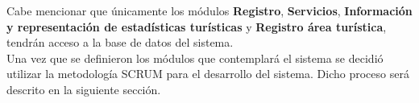 Cabe mencionar que únicamente los módulos \textbf{Registro}, \textbf{Servicios}, \textbf{Información y representación de estadísticas turísticas} y \textbf{Registro área turística}, tendrán acceso a la base de datos del sistema. \\

Una vez que se definieron los módulos que contemplará el sistema se decidió utilizar la metodología SCRUM para el desarrollo del sistema. Dicho proceso será descrito en la siguiente sección.